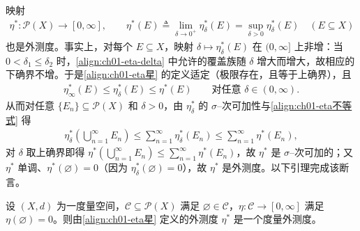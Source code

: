 \documentclass[../../main.tex]{subfiles}%
\begin{document}
映射
\begin{align}
\eta^*:\mathcal{P}(X)\to[0,\infty],\qquad
\eta^*(E)\triangleq\lim_{\delta\to0^+}\eta_\delta^*(E)=\sup_{\delta>0}\eta_\delta^*(E)\quad(E\subseteq X) \label{align:ch01-eta星}
\end{align}
也是外测度。事实上，对每个 $E\subseteq X$，映射 $\delta\mapsto\eta_\delta^*(E)$ 在 $(0,\infty]$ 上非增：当 $0<\delta_1\leqslant\delta_2$ 时，\eqref{align:ch01-eta-delta} 中允许的覆盖族随 $\delta$ 增大而增大，故相应的下确界不增。于是\eqref{align:ch01-eta星} 的定义适定（极限存在，且等于上确界），且
\begin{align}
\eta_\infty^*(E)\leqslant\eta_\delta^*(E)\leqslant\eta^*(E)\qquad\text{对任意 }\delta\in(0,\infty). \label{align:ch01-eta不等式}
\end{align}
从而对任意 $\{E_n\}\subseteq\mathcal{P}(X)$ 和 $\delta>0$，由 $\eta_\delta^*$ 的 $\sigma$--次可加性与\eqref{align:ch01-eta不等式} 得
\begin{align*}
\eta_\delta^*\left(\bigcup_{n=1}^\infty E_n\right)\leqslant\sum_{n=1}^\infty\eta_\delta^*(E_n)\leqslant\sum_{n=1}^\infty\eta^*(E_n),
\end{align*}
对 $\delta$ 取上确界即得 $\eta^*\left(\bigcup_{n=1}^\infty E_n\right)\leqslant\sum_{n=1}^\infty\eta^*(E_n)$，故 $\eta^*$ 是 $\sigma$--次可加的；又 $\eta^*$ 单调、$\eta^*(\varnothing)=0$（因为 $\eta_\delta^*(\varnothing)=0$），故 $\eta^*$ 是外测度。以下引理完成该断言。

\begin{lemma}\label{lemma:ch01-eta星是度量外测度}
设 $(X,d)$ 为一度量空间，$\mathcal{C}\subseteq\mathcal{P}(X)$ 满足 $\varnothing\in\mathcal{C}$，$\eta:\mathcal{C}\to[0,\infty]$ 满足 $\eta(\varnothing)=0$。则由\eqref{align:ch01-eta星} 定义的外测度 $\eta^*$ 是一个度量外测度。
\end{lemma}
\end{document}
